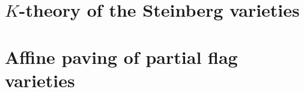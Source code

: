 \documentclass[reqno,11pt,openany]{book}
\numberwithin{equation}{section}
\theoremstyle{plain}
\theoremstyle{plain}
\numberwithin{equation}{section}
\theoremstyle{remark}
\begin{document}
\setcounter{tocdepth}{1}



\part{$K$-theory of the Steinberg varieties}







\part{Affine paving of partial flag varieties}




\end{document}
